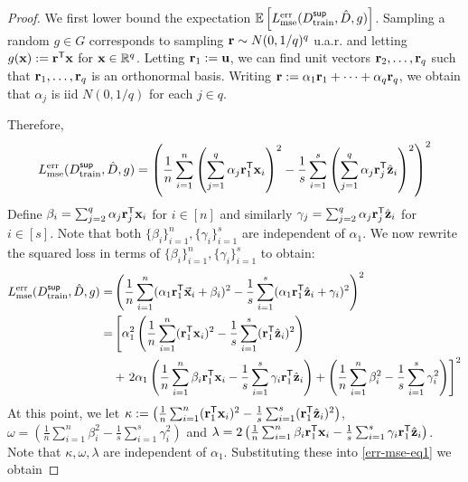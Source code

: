 \begin{proof}
    We first lower bound the expectation $\mathbb{E}\left[L^{\textnormal{err}}_{\textnormal{mse}}(D^{\sf sup}_{\textnormal{train}}, \hat{D}, g)\right]$.
    Sampling a random $g \in G$ corresponds to sampling ${\mathbf{r}} \sim N(0,1/q)^q$ u.a.r. and letting $g({\mathbf{x}}) := {\mathbf{r}}^{\sf T}{\mathbf{x}}$ for ${\mathbf{x}} \in \mathbb{R}^q$.
    Letting ${\mathbf{r}}_1 := {\mathbf{u}}$, we can find unit vectors ${\mathbf{r}}_2, \dots, {\mathbf{r}}_q$ such that ${\mathbf{r}}_1, \dots, {\mathbf{r}}_q$ is an orthonormal basis.
    Writing ${\mathbf{r}} := \alpha_1 {\mathbf{r}}_1 + \dots + \alpha_q {\mathbf{r}}_q$, we obtain that $\alpha_j$ is iid $N(0,1/q)$ for each $j \in q$.
    
    Therefore, 
    \begin{equation}
        L^{\textnormal{err}}_{\textnormal{mse}}(D^{\sf sup}_{\textnormal{train}}, \hat{D}, g) = \left( \frac{1}{n}\sum_{i=1}^n \left(\sum_{j=1}^q\alpha_j {\mathbf{r}}_1^{\sf T}{\mathbf{x}}_i\right)^2  - \frac{1}{s}\sum_{i=1}^s \left(\sum_{j=1}^q\alpha_j{\mathbf{r}}_j^{\sf T}\hat{{\mathbf{z}}}_i \right)^2 \right)^2
    \end{equation}
    Define $\beta_i = \sum_{j=2}^q \alpha_{j}{\mathbf{r}}_j^{\sf T}{\mathbf{x}}_i$ for $i \in [n]$ and similarly $\gamma_j = \sum_{j=2}^q \alpha_{j}{\mathbf{r}}_j^{\sf T}\hat{{\mathbf{z}}}_i$ for $i \in [s]$. Note that both $\{\beta_i\}_{i=1}^n, \{\gamma_i\}_{i=1}^s$ are independent of $\alpha_1$.
    We now rewrite the squared loss in terms of $\{\beta_i\}_{i=1}^n, \{\gamma_i\}_{i=1}^s$ to obtain:
    \begin{align}
    L^{\textnormal{err}}_{\textnormal{mse}}(D^{\sf sup}_{\textnormal{train}}, \hat{D}, g) =& \left( \frac{1}{n}\sum_{i=1}^n (\alpha_1 {\mathbf{r}}_1^{\sf T}\vec{{\mathbf{x}}}_i + \beta_i)^2  - \frac{1}{s}\sum_{i=1}^s (\alpha_1 {\mathbf{r}}_1^{\sf T}\hat{{\mathbf{z}}}_i + \gamma_i)^2 \right)^2 \nonumber \\
        =&\left[\alpha_1^2 \left(\frac{1}{n}\sum_{i=1}^n({\mathbf{r}}_1^{\sf T}{\mathbf{x}}_i)^2-\frac{1}{s}\sum_{i=1}^s({\mathbf{r}}_1^{\sf T}\hat{{\mathbf{z}}}_i)^2\right)\right. \nonumber \\ 
        &+ \left.2\alpha_1 \left(\frac{1}{n}\sum_{i=1}^n\beta_i{\mathbf{r}}_1^{\sf T}{\mathbf{x}}_i -  \frac{1}{s}\sum_{i=1}^s\gamma_i{\mathbf{r}}_1^{\sf T}\hat{{\mathbf{z}}}_i\right) + \left(\frac{1}{n}\sum_{i=1}^n\beta_i^2 -\frac{1}{s}\sum_{i=1}^s\gamma_i^2\right)\right]^2 \label{err-mse-eq1}
    \end{align}
    At this point, we let $\kappa := \left(\frac{1}{n}\sum_{i=1}^n({\mathbf{r}}_1^{\sf T}{\mathbf{x}}_i)^2-\frac{1}{s}\sum_{i=1}^s({\mathbf{r}}_1^{\sf T}\hat{{\mathbf{z}}}_i)^2\right)$, $\omega = \left(\frac{1}{n}\sum_{i=1}^n\beta_i^2 -\frac{1}{s}\sum_{i=1}^s\gamma_i^2\right)$ and 
    $\lambda = 2 \left(\frac{1}{n}\sum_{i=1}^n\beta_i{\mathbf{r}}_1^{\sf T}{\mathbf{x}}_i -  \frac{1}{s}\sum_{i=1}^s\gamma_i{\mathbf{r}}_1^{\sf T}\hat{{\mathbf{z}}}_i\right)$. Note that $\kappa, \omega, \lambda$ are independent of $\alpha_1$. Substituting these into \eqref{err-mse-eq1} we obtain

\end{proof}
